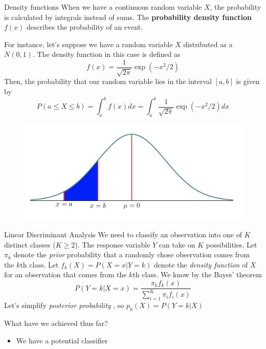 \documentclass{beamer}
\begin{document}
\begin{frame}{Density functions}
	When we have a continuous random variable $X$, the probability is calculated by integrals instead of sums. The {\bf probability density function} $f(x)$ describes the probability of an event. 
	
	For instance, let's suppose we have a random variable $X$ distributed as a $N(0,1)$. The density function in this case is defined as
	\begin{equation*}
		f(x)= \frac{1}{\sqrt{2\pi}} \exp(-x^2/2)
	\end{equation*}
Then, the probability that our random variable lies in the interval  $[a,b]$ is given by
\begin{equation*}
		P(a \le X \le b)= \int_a^b f(x)dx = \int_a^b  \frac{1}{\sqrt{2\pi}} \exp(-x^2/2) dx
\end{equation*}
 \begin{figure}[h]
	\centering
	\includegraphics[scale=0.3]{../../Figures/fig_density.png}
\end{figure}

\end{frame}

\begin{frame}{Linear Discriminant Analysis}
	We need to classify an observation into one of $K$ distinct classes ($K\ge 2$). The response variable $Y$ can take on $K$ possibilities. Let $\pi_k$ denote the {\it prior} probability that a randomly chose observation comes from the $k$th class. Let $f_k(X)= P(X=x|Y=k)$ denote the {\it density function} of $X$ for an observation that comes from the $k$th class. We know by the Bayes' theorem
	\begin{equation*}
		P(Y=k| X=x)= \frac{\pi_k f_k(x)}{\sum_{i=1}^K \pi_i f_i(x)}
	\end{equation*}
 	Let's simplify  {\it posterior probability} , so $p_k(X)=P(Y=k|X)$ 
	
	What have we achieved thus far?
	\begin{itemize}
		\item We have a potential classifier 
	\end{itemize}

\end{frame}
\end{document}
